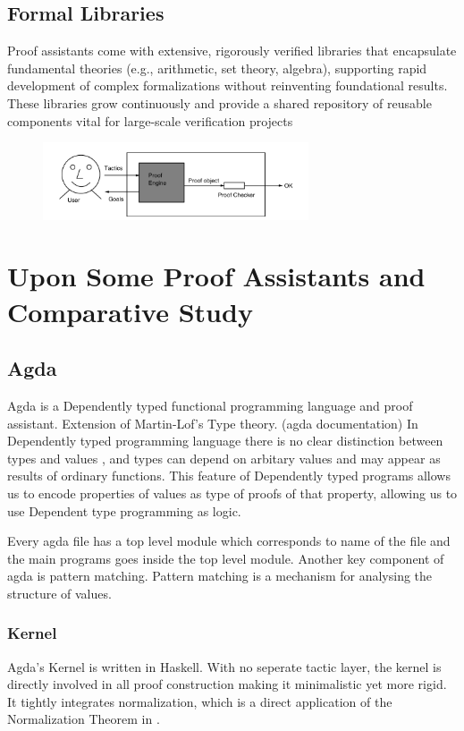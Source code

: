 \documentclass[12pt]{article}
\begin{document}
\subsection{Formal Libraries}
Proof assistants come with extensive, rigorously verified libraries that
encapsulate fundamental theories (e.g., arithmetic, set theory, algebra), supporting rapid development of
complex formalizations without reinventing foundational results.
These libraries grow continuously and provide a shared repository of reusable components vital for large-scale verification projects \cite{rocqstdlib:v9.0.0}


\begin{figure}[h!]
  \centering
  \includegraphics[width=0.7\textwidth]{fig/ui.png} 
  
\end{figure}
\cite{Geuvers20091}

\section{Upon Some Proof Assistants and Comparative Study}
\subsection{ Agda}
Agda  is a Dependently typed functional programming language and proof assistant. Extension of Martin-Lof's Type theory. (agda documentation) 
In Dependently typed programming language there is no clear distinction between types and values , and types can depend on arbitary values and may appear as results of ordinary functions. 
This feature of Dependently typed programs allows us to encode properties of values as type of proofs of that property, allowing us to use Dependent type programming as logic. \cite{norell2008agda}

Every agda file has a top level module which corresponds to name of the file and the main programs goes inside the top level module.
Another key component of agda is pattern matching. Pattern matching is a mechanism for analysing the structure of values. \cite{norell2007thesis}


\subsubsection {Kernel}
Agda's Kernel is written in Haskell. With no seperate tactic layer, the kernel is directly involved in all proof construction making it minimalistic yet more rigid. It tightly integrates normalization, which is a direct application of the Normalization Theorem in \cite{martinlof1972intuitionistic_theory}.
\end{document}
